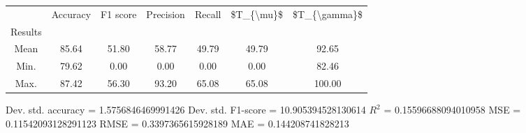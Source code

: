 \begin{tabular}{|c|c|c|c|c|c|c|}
\toprule
{} &  Accuracy &  F1 score &  Precision &  Recall &  \$T\_\{\textbackslash mu\}\$ &  \$T\_\{\textbackslash gamma\}\$ \\
Results &           &           &            &         &            &               \\
\hline
Mean    &     85.64 &     51.80 &      58.77 &   49.79 &      49.79 &         92.65 \\
Min.    &     79.62 &      0.00 &       0.00 &    0.00 &       0.00 &         82.46 \\
Max.    &     87.42 &     56.30 &      93.20 &   65.08 &      65.08 &        100.00 \\
\bottomrule
\end{tabular}

 Dev. std. accuracy = 1.5756846469991426
 Dev. std. F1-score = 10.905394528130614
 $R^2$ = 0.15596688094010958
 MSE = 0.11542093128291123
 RMSE = 0.3397365615928189
 MAE = 0.144208741828213